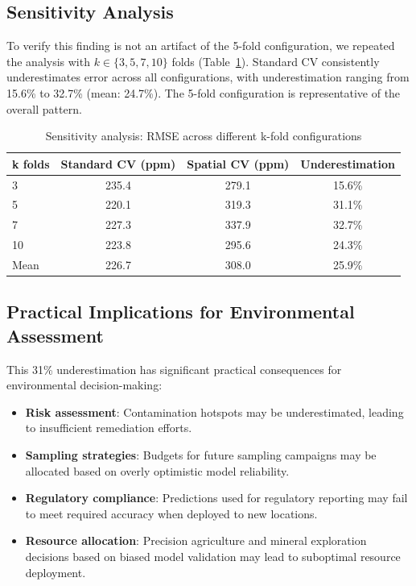 \documentclass[a4paper,fleqn]{cas-sc}
\begin{document}
\subsection{Sensitivity Analysis}

To verify this finding is not an artifact of the 5-fold configuration, we repeated the analysis with $k \in \{3, 5, 7, 10\}$ folds (Table~\ref{tab:sensitivity}). Standard CV consistently underestimates error across all configurations, with underestimation ranging from 15.6\% to 32.7\% (mean: 24.7\%). The 5-fold configuration is representative of the overall pattern.

\begin{table}
\centering
\caption{Sensitivity analysis: RMSE across different k-fold configurations}
\label{tab:sensitivity}
\begin{tabular}{lccc}
\toprule
k folds & Standard CV (ppm) & Spatial CV (ppm) & Underestimation \\
\midrule
3 & 235.4 & 279.1 & 15.6\% \\
5 & 220.1 & 319.3 & 31.1\% \\
7 & 227.3 & 337.9 & 32.7\% \\
10 & 223.8 & 295.6 & 24.3\% \\
\midrule
Mean & 226.7 & 308.0 & 25.9\% \\
\bottomrule
\end{tabular}
\end{table}

\subsection{Practical Implications for Environmental Assessment}

This 31\% underestimation has significant practical consequences for environmental decision-making:

\begin{itemize}
\item \textbf{Risk assessment}: Contamination hotspots may be underestimated, leading to insufficient remediation efforts.
\item \textbf{Sampling strategies}: Budgets for future sampling campaigns may be allocated based on overly optimistic model reliability.
\item \textbf{Regulatory compliance}: Predictions used for regulatory reporting may fail to meet required accuracy when deployed to new locations.
\item \textbf{Resource allocation}: Precision agriculture and mineral exploration decisions based on biased model validation may lead to suboptimal resource deployment.
\end{itemize}
\end{document}
